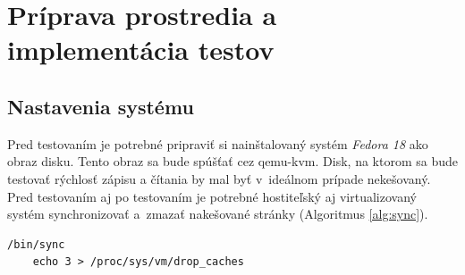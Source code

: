 
%
%

\chapter{Príprava prostredia a implementácia testov}

\section{Nastavenia systému}

Pred testovaním je potrebné pripraviť si nainštalovaný systém \emph{Fedora 18}
ako obraz disku. Tento obraz sa bude spúšťať cez qemu-kvm. Disk, na ktorom sa
bude testovať rýchlosť zápisu a čítania by mal byť v~ideálnom prípade
nekešovaný.  Pred testovaním aj po testovaním je potrebné hostiteľský aj
virtualizovaný systém synchronizovať a~zmazať nakešované stránky (Algoritmus
\ref{alg:sync}).
\\
\begin{lstlisting}[caption=Synchronizácia systému,label=alg:sync]
    /bin/sync
    echo 3 > /proc/sys/vm/drop_caches
\end{lstlisting}

